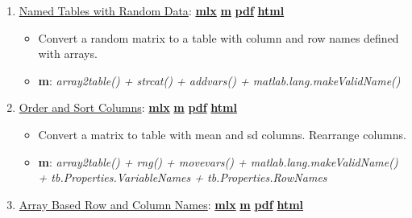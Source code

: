 \documentclass[
]{book}
\providecommand{\tightlist}{%
  \setlength{\itemsep}{0pt}\setlength{\parskip}{0pt}}
\begin{document}
\begin{enumerate}
\def\labelenumi{\arabic{enumi}.}
\tightlist
\item
  \href{https://fanwangecon.github.io/M4Econ/table/main/htmlpdfm/fs_tab_gensample.html}{Named Tables with Random Data}: \href{https://github.com/FanWangEcon/M4Econ/blob/master/table/main/fs_tab_gensample.mlx}{\textbf{mlx}} \textbar{} \href{https://github.com/FanWangEcon/M4Econ/blob/master/table/main/htmlpdfm/fs_tab_gensample.m}{\textbf{m}} \textbar{} \href{https://github.com/FanWangEcon/M4Econ/blob/master/table/main/htmlpdfm/fs_tab_gensample.pdf}{\textbf{pdf}} \textbar{} \href{https://fanwangecon.github.io/M4Econ/table/main/htmlpdfm/fs_tab_gensample.html}{\textbf{html}}

  \begin{itemize}
  \tightlist
  \item
    Convert a random matrix to a table with column and row names defined with arrays.
  \item
    \textbf{m}: \emph{array2table() + strcat() + addvars() + matlab.lang.makeValidName()}
  \end{itemize}
\item
  \href{https://fanwangecon.github.io/M4Econ/table/main/htmlpdfm/fs_tab_ordersort.html}{Order and Sort Columns}: \href{https://github.com/FanWangEcon/M4Econ/blob/master/table/main/fs_tab_ordersort.mlx}{\textbf{mlx}} \textbar{} \href{https://github.com/FanWangEcon/M4Econ/blob/master/table/main/htmlpdfm/fs_tab_ordersort.m}{\textbf{m}} \textbar{} \href{https://github.com/FanWangEcon/M4Econ/blob/master/table/main/htmlpdfm/fs_tab_ordersort.pdf}{\textbf{pdf}} \textbar{} \href{https://fanwangecon.github.io/M4Econ/table/main/htmlpdfm/fs_tab_ordersort.html}{\textbf{html}}

  \begin{itemize}
  \tightlist
  \item
    Convert a matrix to table with mean and sd columns. Rearrange columns.
  \item
    \textbf{m}: \emph{array2table() + rng() + movevars() + matlab.lang.makeValidName() + tb.Properties.VariableNames + tb.Properties.RowNames}
  \end{itemize}
\item
  \href{https://fanwangecon.github.io/M4Econ/table/main/htmlpdfm/fs_tab_rowcolstrs.html}{Array Based Row and Column Names}: \href{https://github.com/FanWangEcon/M4Econ/blob/master/table/main/fs_tab_rowcolstrs.mlx}{\textbf{mlx}} \textbar{} \href{https://github.com/FanWangEcon/M4Econ/blob/master/table/main/htmlpdfm/fs_tab_rowcolstrs.m}{\textbf{m}} \textbar{} \href{https://github.com/FanWangEcon/M4Econ/blob/master/table/main/htmlpdfm/fs_tab_rowcolstrs.pdf}{\textbf{pdf}} \textbar{} \href{https://fanwangecon.github.io/M4Econ/table/main/htmlpdfm/fs_tab_rowcolstrs.html}{\textbf{html}}


\end{enumerate}
\end{document}
